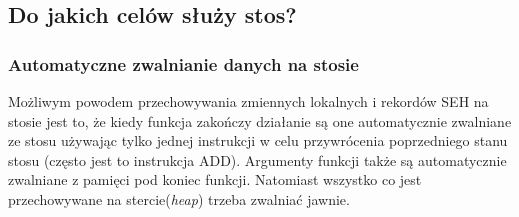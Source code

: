 \subsection{Do jakich celów służy stos?}



\EN{}
\RU{}
\PTBR{}
\PL{}




\subsubsection{Automatyczne zwalnianie danych na stosie}
Możliwym powodem przechowywania zmiennych lokalnych i rekordów SEH na stosie jest to, że kiedy funkcja zakończy działanie są one automatycznie zwalniane ze stosu używając tylko jednej instrukcji w celu przywrócenia poprzedniego stanu stosu (często jest to instrukcja ADD). Argumenty funkcji także są automatycznie zwalniane z pamięci pod koniec funkcji. Natomiast wszystko co jest przechowywane na stercie(\emph{heap}) trzeba zwalniać jawnie.

\EN{}
\RU{}
\PTBR{}
\PL{}




